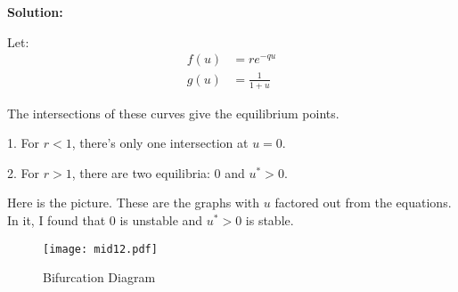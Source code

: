 \documentclass[12pt]{article}
\newenvironment{solution}{
    \textbf{Solution:}
    
}{
    
    \vspace{2em}
}
\begin{document}
\begin{solution}
    Let:
    \[
        \begin{aligned}
            f(u) &= r e^{-qu} \\
            g(u) &= \frac{1}{1 + u}
        \end{aligned}
    \]
    
    The intersections of these curves give the equilibrium points.
    
    1. For \( r < 1 \), there's only one intersection at \( u = 0 \).
    
    2. For \( r > 1 \), there are two equilibria: 0 and \(u^* > 0\).
    
    Here is the picture. These are the graphs with \(u\) factored out from the equations. In it, I found that \(0\) is unstable and \(u^* > 0\) is stable.
    \begin{figure}[H]
        \centering
        \texttt{[image: mid12.pdf]}
        \caption{Bifurcation Diagram}
    \end{figure}
\end{solution}
\end{document}
